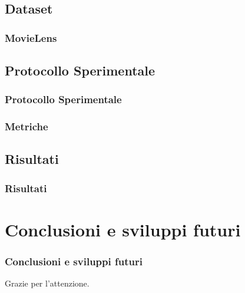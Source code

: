 \documentclass{beamer}
\begin{document}
\subsection{Dataset}


\begin{frame}
\frametitle{MovieLens}
\end{frame}


\subsection{Protocollo Sperimentale}


\begin{frame}
\frametitle{Protocollo Sperimentale}
\end{frame}


\begin{frame}
\frametitle{Metriche}
\end{frame}


\subsection{Risultati}


\begin{frame}
\frametitle{Risultati}
\end{frame}


\section{Conclusioni e sviluppi futuri}
\begin{frame}
\frametitle{Conclusioni e sviluppi futuri}
\end{frame}



\begin{frame}
\begin{center}
Grazie per l'attenzione.
\end{center}
\end{frame}
\end{document}
